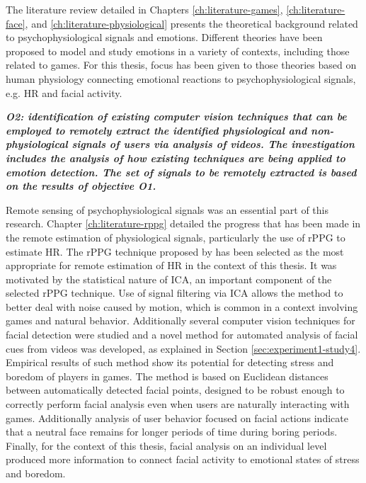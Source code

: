 The literature review detailed in Chapters \ref{ch:literature-games}, \ref{ch:literature-face}, and \ref{ch:literature-physiological} presents the theoretical background related to psychophysiological signals and emotions. Different theories have been proposed to model and study emotions in a variety of contexts, including those related to games. For this thesis, focus has been given to those theories based on human physiology connecting emotional reactions to psychophysiological signals, e.g. HR and facial activity.

\textit{\textbf{O2: identification of existing computer vision techniques that can be employed to remotely extract the identified physiological and non-physiological signals of users via analysis of videos. The investigation includes the analysis of how existing techniques are being applied to emotion detection. The set of signals to be remotely extracted is based on the results of objective \textbf{O1}.}}

Remote sensing of psychophysiological signals was an essential part of this research. Chapter \ref{ch:literature-rppg} detailed the progress that has been made in the remote estimation of physiological signals, particularly the use of rPPG to estimate HR. The rPPG technique proposed by \textcite{poh2011advancements} has been selected as the most appropriate for remote estimation of HR in the context of this thesis. It was motivated by the statistical nature of ICA, an important component of the selected rPPG technique. Use of signal filtering via ICA allows the method to better deal with noise caused by motion, which is common in a context involving games and natural behavior. Additionally several computer vision techniques for facial detection were studied and a novel method for automated analysis of facial cues from videos was developed, as explained in Section \ref{sec:experiment1-study4}. Empirical results of such method show its potential for detecting stress and boredom of players in games. The method is based on Euclidean distances between automatically detected facial points, designed to be robust enough to correctly perform facial analysis even when users are naturally interacting with games. Additionally analysis of user behavior focused on facial actions indicate that a neutral face remains for longer periods of time during boring periods. Finally, for the context of this thesis, facial analysis on an individual level produced more information to connect facial activity to emotional states of stress and boredom.

